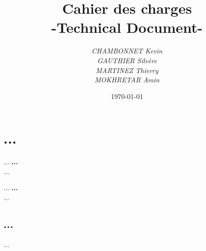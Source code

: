 \documentclass[a4paper]{article}
\title{Cahier des charges\\-Technical Document-}
\author{\emph{CHAMBONNET Kevin}\\\emph{GAUTHIER Silvère}\\\emph{MARTINEZ Thierry}\\\emph{MOKHRETAR Amin}}
\date{\today}
\begin{document}
\maketitle

\section*{...}

...    \textbf{ ... }\\...
\bigskip

...    \textbf{ ... }\\...

\subsection*{...}
...
\end{document}
